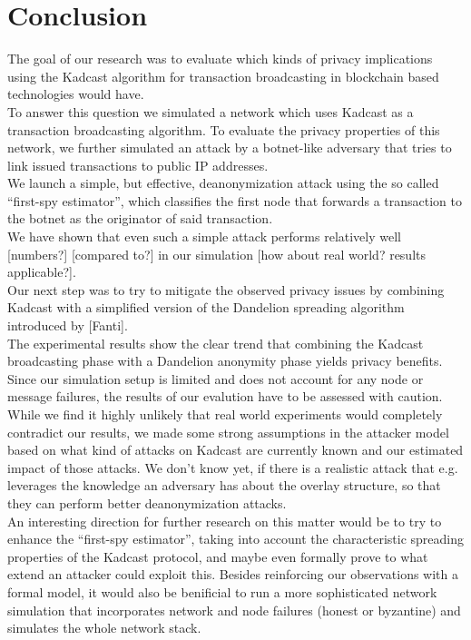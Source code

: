 \section{Conclusion\label{conclusion}}
The goal of our research was to evaluate which kinds of privacy implications using the Kadcast algorithm for
transaction broadcasting in blockchain based technologies would have. \\
To answer this question we simulated a network which uses Kadcast as a transaction broadcasting algorithm.
To evaluate the privacy properties of this network, we further simulated an attack by a botnet-like adversary that tries
to link issued transactions to public IP addresses.\\
We launch a simple, but effective, deanonymization attack using the so called ``first-spy estimator'', which
classifies the first node that forwards a transaction to the botnet as the originator of said transaction. \\
We have shown that even such a simple attack performs relatively
well [numbers?] [compared to?] in our simulation [how about real world?
results applicable?]. \\
Our next step was to try to mitigate the observed privacy issues by
combining Kadcast with a simplified version of the Dandelion spreading
algorithm introduced by [Fanti]. \\
The experimental results show the clear trend that combining the Kadcast broadcasting phase with a Dandelion anonymity phase
yields privacy benefits. \\
Since our simulation setup is limited and does not account for any node or message failures,
the results of our evalution have to be assessed with caution.
While we find it highly unlikely that real world experiments would completely contradict our results, we made some strong
assumptions in the attacker model based on what kind of attacks on Kadcast are currently known and our estimated impact of those attacks.
We don't know yet, if there is a realistic attack that e.g. leverages the knowledge an adversary has about the overlay structure,
so that they can perform better deanonymization attacks. \\
An interesting direction for further research on this matter would be to try to enhance the ``first-spy estimator'',
taking into account the characteristic spreading properties of the Kadcast protocol,
and maybe even formally prove to what extend an attacker could exploit this.
Besides reinforcing our observations with a formal model, it would also be benificial to run a more sophisticated network simulation
that incorporates network and node failures (honest or byzantine) and simulates the whole network stack.
